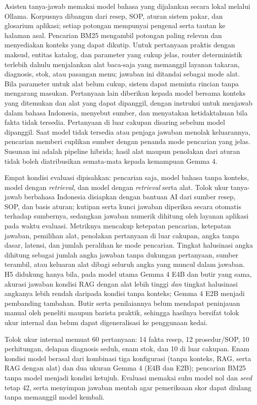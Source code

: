 Asisten tanya-jawab memakai model bahasa yang dijalankan secara lokal melalui Ollama. Korpusnya dibangun dari resep, SOP, aturan sistem pakar, dan glosarium aplikasi; setiap potongan mempunyai pengenal serta tautan ke halaman asal. Pencarian BM25 mengambil potongan paling relevan dan menyediakan konteks yang dapat dikutip. Untuk pertanyaan praktis dengan maksud, entitas katalog, dan parameter yang cukup jelas, router deterministik terlebih dahulu menjalankan alat baca-saja yang memanggil layanan takaran, diagnosis, stok, atau pasangan menu; jawaban ini ditandai sebagai mode alat. Bila parameter untuk alat belum cukup, sistem dapat meminta rincian tanpa mengarang masukan. Pertanyaan lain diberikan kepada model bersama konteks yang ditemukan dan alat yang dapat dipanggil, dengan instruksi untuk menjawab dalam bahasa Indonesia, menyebut sumber, dan menyatakan ketidaktahuan bila fakta tidak tersedia. Pertanyaan di luar cakupan disaring sebelum model dipanggil. Saat model tidak tersedia atau penjaga jawaban menolak keluarannya, pencarian memberi cuplikan sumber dengan penanda mode pencarian yang jelas. Susunan ini adalah pipeline hibrida; hasil alat maupun penolakan dari aturan tidak boleh diatribusikan semata-mata kepada kemampuan Gemma 4.

Empat kondisi evaluasi dipisahkan: pencarian saja, model bahasa tanpa konteks, model dengan \textit{retrieval}, dan model dengan \textit{retrieval} serta alat. Tolok ukur tanya-jawab berbahasa Indonesia disiapkan dengan bantuan AI dari sumber resep, SOP, dan basis aturan; kutipan serta kunci jawaban diperiksa secara otomatis terhadap sumbernya, sedangkan jawaban numerik dihitung oleh layanan aplikasi pada waktu evaluasi. Metriknya mencakup ketepatan pencarian, ketepatan jawaban, pemilihan alat, penolakan pertanyaan di luar cakupan, angka tanpa dasar, latensi, dan jumlah peralihan ke mode pencarian. Tingkat halusinasi angka dihitung sebagai jumlah angka jawaban tanpa dukungan pertanyaan, sumber terambil, atau keluaran alat dibagi seluruh angka yang muncul dalam jawaban. H5 didukung hanya bila, pada model utama Gemma 4 E4B dan butir yang sama, akurasi jawaban kondisi RAG dengan alat lebih tinggi \emph{dan} tingkat halusinasi angkanya lebih rendah daripada kondisi tanpa konteks; Gemma 4 E2B menjadi pembanding tambahan. Butir serta penilaiannya belum mendapat peninjauan manual oleh peneliti maupun barista praktik, sehingga hasilnya bersifat tolok ukur internal dan belum dapat digeneralisasi ke penggunaan kedai.

Tolok ukur internal memuat 60 pertanyaan: 14 fakta resep, 12 prosedur/SOP, 10 perhitungan, delapan diagnosis seduh, enam stok, dan 10 di luar cakupan. Enam kondisi model berasal dari kombinasi tiga konfigurasi (tanpa konteks, RAG, serta RAG dengan alat) dan dua ukuran Gemma 4 (E4B dan E2B); pencarian BM25 tanpa model menjadi kondisi ketujuh. Evaluasi memakai suhu model nol dan \textit{seed} tetap 42, serta menyimpan jawaban mentah agar pemeriksaan skor dapat diulang tanpa memanggil model kembali.

